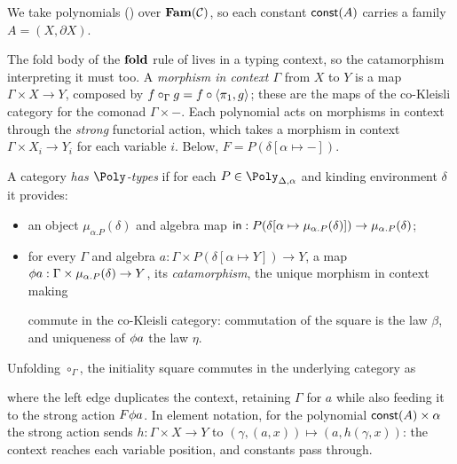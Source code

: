 We take polynomials () over $\mathbf{Fam}(\mathcal{C})$, so each constant
$\mathsf{const}(A)$ carries a family $A = (X, \partial X)$.

The fold body of the $\mathbf{fold}$ rule of  lives in a typing context,
so the catamorphism interpreting it must too. A \emph{morphism in context $\Gamma$} from $X$ to $Y$ is
a map $\Gamma \times X \to Y$, composed by $f \circ_\Gamma g = f \circ \langle \pi_1, g\rangle$; these are
the maps of the co-Kleisli category for the comonad $\Gamma \times -$. Each polynomial acts on
morphisms in context through the \emph{strong} functorial action, which takes a morphism in context
$\Gamma \times X_i \to Y_i$ for each variable $i$. Below, $F = P(\delta[\alpha \mapsto -])$.

\begin{definition}
\label{def:polynomial-types:has-poly}
A category \emph{has $\Poly$-types} if for each $P \in \Poly_{\Delta,\alpha}$ and kinding environment $\delta$
it provides:
\begin{itemize}
\item an object $\mu_{\alpha.P}(\delta)$ and algebra map $\mathsf{in} : P(\delta[\alpha \mapsto
  \mu_{\alpha.P}(\delta)]) \to \mu_{\alpha.P}(\delta)$;
\item for every $\Gamma$ and algebra $a : \Gamma \times P(\delta[\alpha \mapsto Y]) \to Y$, a map
  $\phi{a} : \Gamma \times \mu_{\alpha.P}(\delta) \to Y$, its \emph{catamorphism}, the unique
  morphism in context making
  \begin{center}
  \end{center}
  commute in the co-Kleisli category: commutation of the square is the law $\beta$, and uniqueness
  of $\phi{a}$ the law $\eta$.
\end{itemize}
\end{definition}

\noindent
Unfolding $\circ_\Gamma$, the initiality square commutes in the underlying category as
\begin{center}
\end{center}
\noindent
where the left edge duplicates the context, retaining $\Gamma$ for $a$ while also feeding it
to the strong action $F\phi{a}$. In element notation, for the polynomial $\mathsf{const}(A) \times \alpha$
the strong action sends $h : \Gamma \times X \to Y$ to $(\gamma, (a, x)) \mapsto (a, h(\gamma, x))$:
the context reaches each variable position, and constants pass through.

